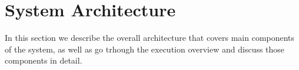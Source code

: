 \section{System Architecture}
\label{ch5}

In this section we describe the overall architecture that covers main components of the system, as well as go trhough the execution overview and discuss those components in detail.




